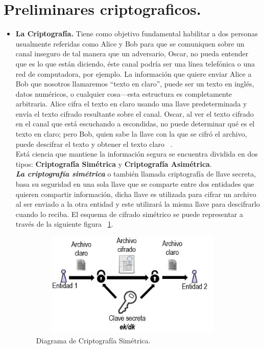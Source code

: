 
\section{Preliminares criptograficos. }
 \begin{itemize}
\item \textbf{La Criptografía. }
Tiene como objetivo fundamental habilitar a dos personas usualmente referidas como Alice y Bob para que se comuniquen sobre un canal inseguro de tal manera que un adversario, Oscar, no pueda entender que es lo que están diciendo, éste canal podría ser una línea telefónica o una red de computadora, por ejemplo. La información que quiere enviar Alice a Bob que nosotros llamaremos “texto en claro”, puede ser un texto en inglés, datos numéricos, o cualquier cosa---esta estructura es completamente arbitraria. Alice cifra el texto en claro usando una llave predeterminada y envía el texto cifrado resultante sobre el canal. Oscar, al ver el texto cifrado en el canal que está escuchando a escondidas, no puede determinar qué es el texto en claro; pero Bob, quien sabe la llave con la que se cifró el archivo, puede descifrar el texto y obtener el texto claro ~\cite{stinson}.\\

Está ciencia que mantiene la información segura se encuentra dividida en dos tipos: \textbf{Criptografía Simétrica} y \textbf{Criptografía Asimétrica}.  \\

\textbf {\textit{La criptografía simétrica}} o también llamada criptografía de llave secreta, basa su seguridad en una sola llave que se comparte entre dos entidades que quieren compartir información, dicha llave es utilizada para cifrar un archivo al ser enviado a la otra entidad y este utilizará la misma llave para descifrarlo cuando lo reciba. El esquema de cifrado simétrico se puede representar a través de la siguiente figura ~\ref{fig:2-3-1}. \\

\begin{figure}[H]
\centering
	\includegraphics[width=10cm, height=5cm]{./images/Cripto_Simetrica.jpg}
	\caption{Diagrama de Criptografía Simétrica.}
	\label{fig:2-3-1}
\end{figure}


\end{itemize}
